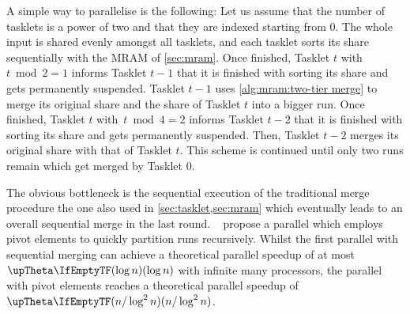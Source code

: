 \medbreak

A simple way to parallelise \MS{} is the following:
Let us assume that the number of tasklets is a power of two and that they are indexed starting from 0.
The whole input is shared evenly amongst all tasklets, and each tasklet sorts its share sequentially with the MRAM \MS{} of \cref{sec:mram}.
Once finished, Tasklet \(t\) with \(t \bmod 2 = 1\) informs Tasklet \(t - 1\) that it is finished with sorting its share and gets permanently suspended.
Tasklet \(t - 1\) uses \cref{alg:mram:two-tier merge} to merge its original share and the share of Tasklet \(t\) into a bigger run.
Once finished, Tasklet \(t\) with~\(t \bmod 4 = 2\) informs Tasklet \(t - 2\) that it is finished with sorting its share and gets permanently suspended.
Then, Tasklet \(t - 2\) merges its original share with that of Tasklet \(t\).
This scheme is continued until only two runs remain which get merged by Tasklet \(0\).

The obvious bottleneck is the sequential execution of the traditional merge procedure \Dash the one also used in \cref{sec:tasklet,sec:mram} \Dash which eventually leads to an overall sequential merge in the last round.
~\cite{cormen2013algorithmen} propose a parallel \MS{} which employs pivot elements to quickly partition runs recursively.
Whilst the first parallel \MS{} with sequential merging can achieve a theoretical parallel speedup of at most \(\bigtheta{\log n}\) with infinite many processors, the parallel \MS{} with pivot elements reaches a theoretical parallel speedup of \(\bigtheta{n / \log^2 n}\).

